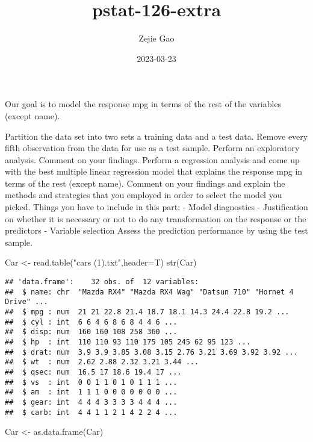 \documentclass[
]{article}
\title{pstat-126-extra}
\author{Zejie Gao}
\date{2023-03-23}
\newenvironment{Shaded}{\begin{snugshade}}{\end{snugshade}}
\newcommand{\AttributeTok}[1]{\textcolor[rgb]{0.77,0.63,0.00}{#1}}
\newcommand{\FunctionTok}[1]{\textcolor[rgb]{0.00,0.00,0.00}{#1}}
\newcommand{\NormalTok}[1]{#1}
\newcommand{\OtherTok}[1]{\textcolor[rgb]{0.56,0.35,0.01}{#1}}
\newcommand{\StringTok}[1]{\textcolor[rgb]{0.31,0.60,0.02}{#1}}
\begin{document}
\maketitle

Our goal is to model the response mpg in terms of the rest of the
variables (except name).

Partition the data set into two sets a training data and a test data.
Remove every fifth observation from the data for use as a test sample.
Perform an exploratory analysis. Comment on your findings. Perform a
regression analysis and come up with the best multiple linear regression
model that explains the response mpg in terms of the rest (except name).
Comment on your findings and explain the methods and strategies that you
employed in order to select the model you picked. Things you have to
include in this part: - Model diagnostics - Justification on whether it
is necessary or not to do any transformation on the response or the
predictors - Variable selection Assess the prediction performance by
using the test sample.

\begin{Shaded}
\begin{Highlighting}[]
\NormalTok{Car }\OtherTok{\textless{}{-}} \FunctionTok{read.table}\NormalTok{(}\StringTok{"cars (1).txt"}\NormalTok{,}\AttributeTok{header=}\NormalTok{T)}
\FunctionTok{str}\NormalTok{(Car)}
\end{Highlighting}
\end{Shaded}

\begin{verbatim}
## 'data.frame':    32 obs. of  12 variables:
##  $ name: chr  "Mazda RX4" "Mazda RX4 Wag" "Datsun 710" "Hornet 4 Drive" ...
##  $ mpg : num  21 21 22.8 21.4 18.7 18.1 14.3 24.4 22.8 19.2 ...
##  $ cyl : int  6 6 4 6 8 6 8 4 4 6 ...
##  $ disp: num  160 160 108 258 360 ...
##  $ hp  : int  110 110 93 110 175 105 245 62 95 123 ...
##  $ drat: num  3.9 3.9 3.85 3.08 3.15 2.76 3.21 3.69 3.92 3.92 ...
##  $ wt  : num  2.62 2.88 2.32 3.21 3.44 ...
##  $ qsec: num  16.5 17 18.6 19.4 17 ...
##  $ vs  : int  0 0 1 1 0 1 0 1 1 1 ...
##  $ am  : int  1 1 1 0 0 0 0 0 0 0 ...
##  $ gear: int  4 4 4 3 3 3 3 4 4 4 ...
##  $ carb: int  4 4 1 1 2 1 4 2 2 4 ...
\end{verbatim}

\begin{Shaded}
\begin{Highlighting}[]
\NormalTok{Car }\OtherTok{\textless{}{-}} \FunctionTok{as.data.frame}\NormalTok{(Car)}
\end{Highlighting}
\end{Shaded}
\end{document}
